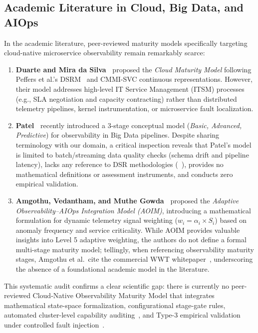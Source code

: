\subsection{Academic Literature in Cloud, Big Data, and AIOps}
\label{subsec:academic_models}

In the academic literature, peer-reviewed maturity models specifically targeting cloud-native microservice observability remain remarkably scarce:
\begin{enumerate}[leftmargin=*, nosep]
    \item \textbf{Duarte and Mira da Silva~\cite{duarte_2013}} proposed the \textit{Cloud Maturity Model} following Peffers et al.'s DSRM~\cite{peffers_2007} and CMMI-SVC continuous representations. However, their model addresses high-level IT Service Management (ITSM) processes (e.g., SLA negotiation and capacity contracting) rather than distributed telemetry pipelines, kernel instrumentation, or microservice fault localization.
    \item \textbf{Patel~\cite{patel_2025}} recently introduced a 3-stage conceptual model (\textit{Basic, Advanced, Predictive}) for observability in Big Data pipelines. Despite sharing terminology with our domain, a critical inspection reveals that Patel's model is limited to batch/streaming data quality checks (schema drift and pipeline latency), lacks any reference to DSR methodologies (~\cite{becker_2009, debruin_2005, wendler_2012}), provides no mathematical definitions or assessment instruments, and conducts zero empirical validation.
    \item \textbf{Amgothu, Vedantham, and Muthe Gowda~\cite{amgothu_2025}} proposed the \textit{Adaptive Observability--AIOps Integration Model (AOIM)}, introducing a mathematical formulation for dynamic telemetry signal weighting ($w_i = \alpha_i \times S_i$) based on anomaly frequency and service criticality. While AOIM provides valuable insights into Level 5 adaptive weighting, the authors do not define a formal multi-stage maturity model; tellingly, when referencing observability maturity stages, Amgothu et al.\ cite the commercial WWT whitepaper~\cite{wwt_omm_2025}, underscoring the absence of a foundational academic model in the literature.
\end{enumerate}

This systematic audit confirms a clear scientific gap: there is currently no peer-reviewed Cloud-Native Observability Maturity Model that integrates mathematical state-space formalization, configurational stage-gate rules, automated cluster-level capability auditing~\cite{proenca_2016_rcis}, and Type-3 empirical validation under controlled fault injection~\cite{helgesson_2012}.

